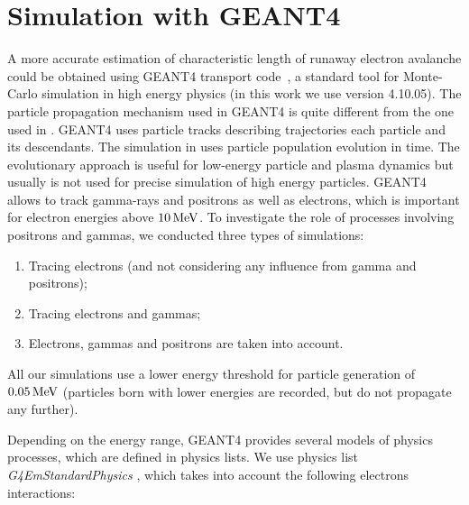 \documentclass[doublecol,linenumbers]{epl2} %
\begin{document}
    \section{Simulation with GEANT4}
    \label{sec:swg}
    A more accurate estimation of characteristic length of runaway electron avalanche could be obtained using GEANT4 transport code~\cite{Geant2003,Geant2006, Geant2016}, a standard tool for Monte-Carlo simulation in high energy physics (in this work we use version 4.10.05). The particle propagation mechanism used in GEANT4 is quite different from the one used in \cite{Oreshkin_2018}. GEANT4 uses particle tracks describing trajectories each particle and its descendants. The simulation in \cite{Oreshkin_2018} uses particle population evolution in time. The evolutionary approach is useful for low-energy particle and plasma dynamics but usually is not used for precise simulation of high energy particles. GEANT4 allows to track gamma-rays and positrons as well as electrons, which is important for electron energies above $10\un{MeV}$. To investigate the role of processes involving positrons and gammas, we conducted three types of simulations: 
    \begin{enumerate}
        \item Tracing electrons (and not considering any influence from gamma and positrons);
        \item Tracing electrons and gammas;
        \item Electrons, gammas and positrons are taken into account.
    \end{enumerate}
    
    All our simulations use a lower energy threshold for particle generation of $0.05\un{MeV}$ (particles born with lower energies are recorded, but do not propagate any further).
    
    Depending on the energy range, GEANT4 provides several models of physics processes, which are defined in physics lists. We use physics list \textit{G4EmStandardPhysics} , which takes into account the following electrons interactions:
    
\end{document}
